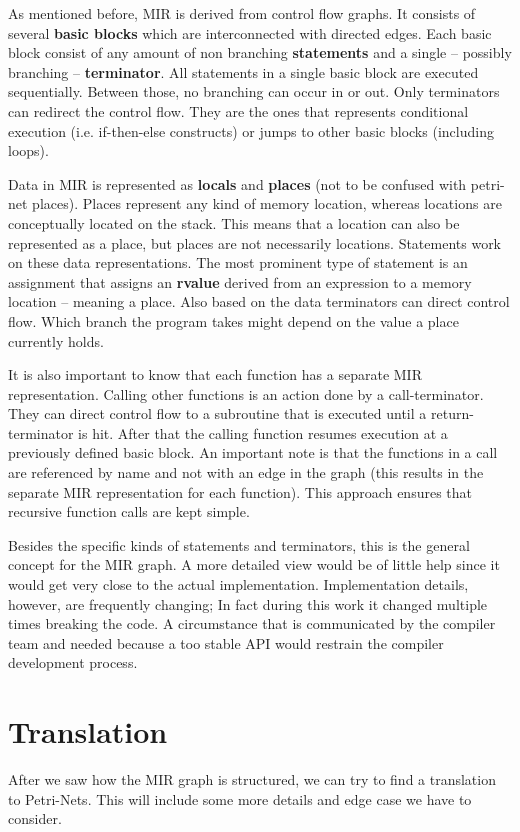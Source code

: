 As mentioned before, MIR is derived from control flow graphs\cite[chapter 2.17]{rustc-guide}.
It consists of several \textbf{basic blocks} which are interconnected with directed edges.
Each basic block consist of any amount of non branching \textbf{statements} and a single -- possibly branching -- \textbf{terminator}.
All statements in a single basic block are executed sequentially.
Between those, no branching can occur in or out.
Only terminators can redirect the control flow.
They are the ones that represents conditional execution (i.e. if-then-else constructs) or jumps to other basic blocks (including loops).

Data in MIR is represented as \textbf{locals} and \textbf{places} (not to be confused with petri-net places).
Places represent any kind of memory location, whereas locations are conceptually located on the stack.
This means that a location can also be represented as a place, but places are not necessarily locations.
Statements work on these data representations.
The most prominent type of statement is an assignment that assigns an \textbf{rvalue} derived from an expression to a memory location -- meaning a place.
Also based on the data terminators can direct control flow.
Which branch the program takes might depend on the value a place currently holds.

It is also important to know that each function has a separate MIR representation.
Calling other functions is an action done by a call-terminator.
They can direct control flow to a subroutine that is executed until a return-terminator is hit.
After that the calling function resumes execution at a previously defined basic block.
An important note is that the functions in a call are referenced by name and not with an edge in the graph (this results in the separate MIR representation for each function).
This approach ensures that recursive function calls are kept simple.

Besides the specific kinds of statements and terminators, this is the general concept for the MIR graph.
A more detailed view would be of little help since it would get very close to the actual implementation.
Implementation details, however, are frequently changing;
In fact during this work it changed multiple times breaking the code.
A circumstance that is communicated by the compiler team and needed because a too stable API would restrain the compiler development process.


\section{Translation}
\label{app_trans}
After we saw how the MIR graph is structured, we can try to find a translation to Petri-Nets. This will include some more details and edge case we have to consider.

